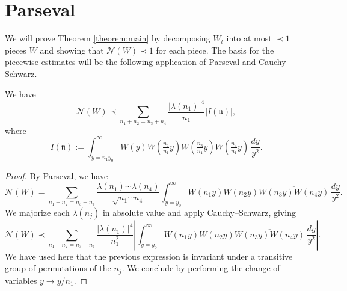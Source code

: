 \documentclass[reqno]{amsart} 
\begin{document}
\section{Parseval}\label{sec:cqx50az21s}
We will prove Theorem \ref{theorem:main} by decomposing $W_t$ into at most $\prec 1$ pieces $W$ and showing that $\mathcal{N}(W) \prec 1$ for each piece.  The basis for the piecewise estimates will be the following application of Parseval and Cauchy--Schwarz.
\begin{lemma}\label{lemma:unfolding}
  We have
  \begin{equation*}
    \mathcal{N}(W) \prec
    \sum _{n_1 + n_2 = n_3 + n_4}
    \frac{\left\lvert \lambda(n_1) \right\rvert^4}{n_1} \left\lvert I(\mathfrak{n}) \right\rvert,
  \end{equation*}
  where
  \begin{equation}\label{equation:definition-of-I-of-n}
    I(\mathfrak{n}) :=
    \int _{y = n_1 y _0 } ^\infty W (y ) W (\tfrac{n_2}{n _1} y) \overline{W (\tfrac{n _3 }{ n _1 } y) W (\tfrac{n _4}{n_1} y)} \, \frac{d y}{y^2}.
  \end{equation}
\end{lemma}
\begin{proof}
  By Parseval, we have
  \begin{equation*}
    \mathcal{N}(W) = \sum _{n _1 + n _2 = n _3 + n _4 }
    \frac{\lambda (n _1) \dotsb \lambda (n _4 )}{\sqrt{n _1 \dotsb n _4 }}
    \int _{y = y _0 } ^\infty
    W (n _1 y)
    W (n _2 y)
    \overline{W (n _3 y)
      W (n _4 y)}
    \, \frac{d y}{ y ^2 }.
  \end{equation*}
  We majorize each $\lambda(n_j)$ in absolute value and apply Cauchy--Schwarz, giving
  \begin{equation*}
    \mathcal{N}(W) \prec
    \sum _{n_1 + n_2 = n_3 + n_4}
    \frac{\left\lvert \lambda(n_1) \right\rvert^4}{n_1^2}
    \left\lvert
      \int _{y = y _0 } ^\infty W (n _1 y ) W (n _2 y) \overline{W (n _3 y) W (n _4 y)} \, \frac{d y}{y^2}
    \right\rvert.
  \end{equation*}
  We have used here that the previous expression is invariant under a transitive group of permutations of the $n_j$.  We conclude by performing the change of variables $y \rightarrow y / n_1$.
\end{proof}
\end{document}
